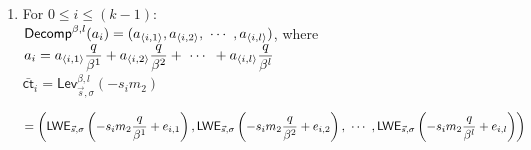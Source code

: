 \begin{myproof}
\begin{enumerate}
Therefore: \\
$\langle \textsf{Decomp}^{\beta, l}(b), \bar{\textsf{ct}}_k \rangle$\\
$= b_1 \cdot \textsf{LWE}_{\vec{s}, \sigma} \left (m_{2}\dfrac{q}{\beta^1}  + e_{2, 1}\right ) + b_2 \cdot \textsf{LWE}_{\vec{s}, \sigma} \left (m_{2}\dfrac{q}{\beta^2}  + e_{2, 2}\right ) + \gap{$\cdots$} + b_l \cdot \textsf{LWE}_{\vec{s}, \sigma} \left (m_{2}\dfrac{q}{\beta^l}  + e_{2, l}\right)$ \\
$= \textsf{LWE}_{\vec{s}, \sigma} \left (b_1m_{2}\dfrac{q}{\beta^1}  + b_1e_{2, 1}\right ) + \textsf{LWE}_{\vec{s}, \sigma} \left (b_2m_{2}\dfrac{q}{\beta^2}  + b_2e_{2,2}\right ) + \gap{$\cdots$} + \textsf{LWE}_{\vec{s}, \sigma} \left (b_lm_{2}\dfrac{q}{\beta^l} + b_le_{2, l}\right)$ \textcolor{red}{ $\rhd$ from \autoref{sec:glwe-mult-plain}} \\
$= \textsf{LWE}_{\vec{s}, \sigma} \left (b_1m_{2}\dfrac{q}{\beta^1} + b_2m_{2}\dfrac{q}{\beta^2} + \gap{$\cdots$} + b_lm_{2}\dfrac{q}{\beta^l} + b_1e_{2,1} + \cdots + b_le_{2,l}\right)$ \textcolor{red}{ $\rhd$ from \autoref{sec:glwe-add-cipher}}\\
$= \textsf{LWE}_{\vec{s}, \sigma} \left (m_{2} \cdot \left ( b_1\dfrac{q}{\beta^1} + b_2\dfrac{q}{\beta^2} + \gap{$\cdots$} + b_l\dfrac{q}{\beta^l} + e^{\langle k \rangle} \right)\right)$ \textcolor{red}{ $\rhd$ where $e^{\langle k \rangle} = \sum\limits_{i=1}^{l}b_ie_{2, i}$}\\
$= \textsf{LWE}_{\vec{s}, \sigma} (m_{2}b + e^{\langle k \rangle})$ \textcolor{red}{ $\rhd$ from \autoref{subsec:poly-decomp}}

\item For $0 \leq i \leq (k - 1)$: \\
$\textsf{Decomp}^{\beta, l}(a_i) = (a_{\langle i, 1 \rangle}, a_{\langle i, 2 \rangle}, \text{ } \text{$\cdots$} \text{ }, a_{\langle i, l \rangle})$, where $a_i = a_{\langle i, 1 \rangle}\dfrac{q}{\beta^1} + a_{\langle i, 2 \rangle}\dfrac{q}{\beta^2} + \text{ } \text{$\cdots$} \text{ } + a_{\langle i, l \rangle}\dfrac{q}{\beta^l}$ \\
$\bar{\textsf{ct}}_i =  \textsf{Lev}_{\vec{s}, \sigma}^{\beta, l}(-s_im_2) $

$= \left(\textsf{LWE}_{\vec{s}, \sigma}\left(-s_im_2\dfrac{q}{\beta^1} + e_{i, 1}\right), \textsf{LWE}_{\vec{s}, \sigma}\left(-s_im_2\dfrac{q}{\beta^2} + e_{i, 2}\right), \text{ } \text{$\cdots$} \text{ }, \textsf{LWE}_{\vec{s}, \sigma}\left(-s_im_2\dfrac{q}{\beta^l} + e_{i, l}\right) \right)$ \\


\end{enumerate}
\end{myproof}
